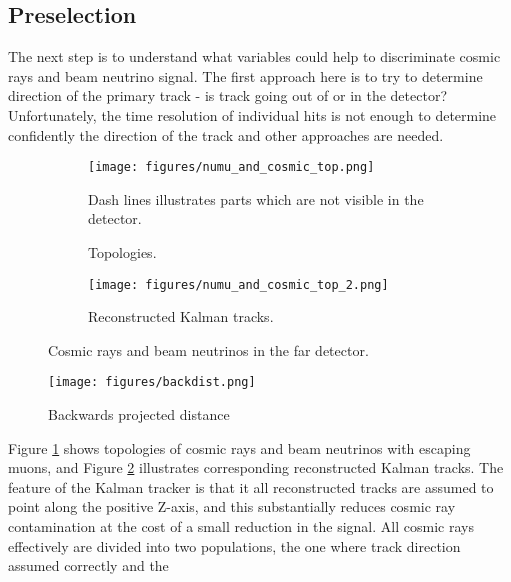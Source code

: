 \subsection{Preselection} \label{presel}
The next step is to understand what variables could help to discriminate cosmic rays and beam neutrino
signal. The first approach here is to try to determine direction of the primary track - is track going 
out of or in the detector? Unfortunately, the time resolution of individual hits is not enough to determine 
confidently the direction of the track and other approaches are needed. 
\begin{figure}[h]
\begin{subfigure}[t]{0.9\textwidth}
  \centering
  \texttt{[image: figures/numu\_and\_cosmic\_top.png]}
  \caption{Topologies.}
  {Dash lines illustrates parts which are not visible in the detector.}
  \label{fig:cosmic_top}
\end{subfigure}
\vspace{0.5cm}
\newline
\begin{subfigure}[t]{0.9\textwidth}
  \centering
  \texttt{[image: figures/numu\_and\_cosmic\_top\_2.png]}
  \caption{Reconstructed Kalman tracks.}
  \label{fig:cosmic_top_2}
\end{subfigure}
\caption{Cosmic rays and beam neutrinos in the far detector.}
\label{fig:top_and_reco_tracks}
\end{figure}
\newline
\newline
\begin{wrapfigure}{r}{0.5\textwidth}
\vspace{-15pt}
  \begin{center}
    \texttt{[image: figures/backdist.png]}
  \end{center}
\vspace{0.5mm}
\caption{Backwards projected distance}
\label{fig:bakdist}
\end{wrapfigure}
Figure \ref{fig:cosmic_top} shows topologies of cosmic rays and beam neutrinos with escaping muons, and Figure
\ref{fig:cosmic_top_2} illustrates corresponding reconstructed Kalman tracks. The feature of the Kalman 
tracker is that it all reconstructed tracks are assumed to point along the positive Z-axis, and this substantially 
reduces cosmic ray contamination at the cost of a small reduction in the signal. All cosmic 
rays effectively are divided into two populations, the one where track direction assumed correctly and the 
